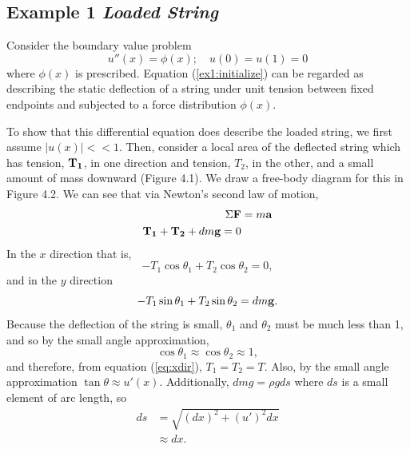 \subsection{Example 1 \textit{Loaded String}}
    
    Consider the boundary value problem
    \begin{equation} \label{ex1:initialize}
        u''(x) = \phi(x);\quad u(0)=u(1)=0
    \end{equation}
    where \(\phi(x)\) is prescribed. Equation (\ref{ex1:initialize}) can be regarded as describing the static deflection of a string under unit tension between fixed endpoints and subjected to a force distribution \(\phi(x)\).

    To show that this differential equation does describe the loaded string, we first assume \(|u(x)|<<1\). Then, consider a local area of the deflected string which has tension, \(\bf{T_1}\), in one direction and tension, \(T_2\), in the other, and a small amount of mass downward (Figure 4.1). We draw a free-body diagram for this in Figure 4.2. We can see that via Newton's second law of motion,
    \begin{equation*}
        \begin{split}
            \Sigma \mathbf{F} &= m\mathrm{\bf{a}}\\
            \mathrm{\bf{T_1}} + \mathrm{\bf{T_2}} + dm\mathrm{\bf{g}} = 0
        \end{split}
    \end{equation*}
    In the \(x\) direction that is,
    \begin{equation}\label{eq:xdir}
        -T_1\cos \theta_1 + T_2 \cos\theta_2 = 0,
    \end{equation}
    and in the \(y\) direction
    \begin{equation}\label{eq:ydir}
        -T_1\sin\theta_1 + T_2\sin\theta_2 = dm\mathrm{\bf{g}}.
    \end{equation}
    Because the deflection of the string is small, \(\theta_1\) and \(\theta_2\) must be much less than 1, and so by the small angle approximation,
    \begin{equation*}
        \cos \theta_1 \approx \cos \theta_2 \approx 1,
    \end{equation*}
    and therefore, from equation (\ref{eq:xdir}), \(T_1=T_2=T\). Also, by the small angle approximation \(\tan \theta\approx u'(x)\). Additionally, \(dmg = \rho g ds\) where \(ds\) is a small element of arc length, so 
    \begin{equation*}
        \begin{split}
            ds &= \sqrt{(dx)^2 + (u')^2dx}\\
            &\approx dx.
        \end{split}
    \end{equation*}
    
